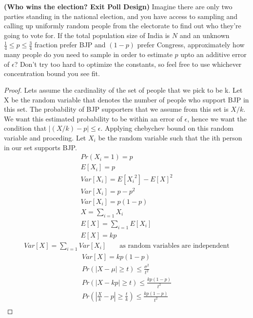 \documentclass[solution,addpoints,12pt]{exam}
\begin{document}
\begin{questions}
\begin{parts}
\end{parts}

\question[15] \textbf{(Who wins the election? Exit Poll Design)} Imagine there are only two parties standing in the national election, and you have access to sampling and calling up uniformly random people from the electorate to find out who they're going to vote for. If the total population size of India is $N$ and an unknown $\frac14 \leq p \leq \frac34$ fraction prefer BJP and $(1-p)$ prefer Congress, approximately how many people do you need to sample in order to estimate $p$ upto an additive error of $\epsilon$? Don't try too hard to optimize the constants, so feel free to use whichever concentration bound you see fit.
  \begin{solution}
  \begin{proof}
  	Lets assume the cardinality of the set of people that we pick to be k. Let X be the random variable that denotes the number of people who support BJP in this set. The probability of BJP supporters that we assume from this set is $X/k$. We want this estimated probability to be within an error of $\epsilon$, hence we want the condition that $|(X/k) - p| \leq \epsilon$. Applying chebychev bound on this random variable and proceding. Let $X_i$ be the random variable such that the ith person in our set supports BJP.
  	\begin{align*}
	  	Pr(X_i = 1) = p
	  	\\
	  	E[X_i] = p
	  	\\
	  	Var[X_i] = E[{X_i}^2] - {E[X]}^2
	  	\\
	  	Var[X_i] = p - {p}^2
	  	\\
	  	Var[X_i] = p(1-p)
	  	\\
	  	X = \sum_{i=1}X_i
	  	\\
	  	E[X] = \sum_{i=1}E[X_i]
	  	\\
	  	E[X] = kp
	  	\end{align*}
	  	\begin{align*}
	  	Var[X] = \sum_{i=1}Var[X_i] && \text{ as random variables are independent}
	  	\end{align*}
	  	\begin{align*}
	  	Var[X] = kp(1-p)
	  	\\
	  	Pr(|X-\mu| \geq t) \leq \frac{\sigma^2}{t^2}
	  	\\
	  	Pr(|X-kp| \geq t) \leq \frac{kp(1-p)}{t^2}
	  	\\
  		Pr(|\frac{X}{k} - p| \geq \frac{t}{k}) \leq \frac{kp(1-p)}{t^2}
  		\\

\end{align*}
\end{proof}
\end{solution}
\end{questions}
\end{document}
